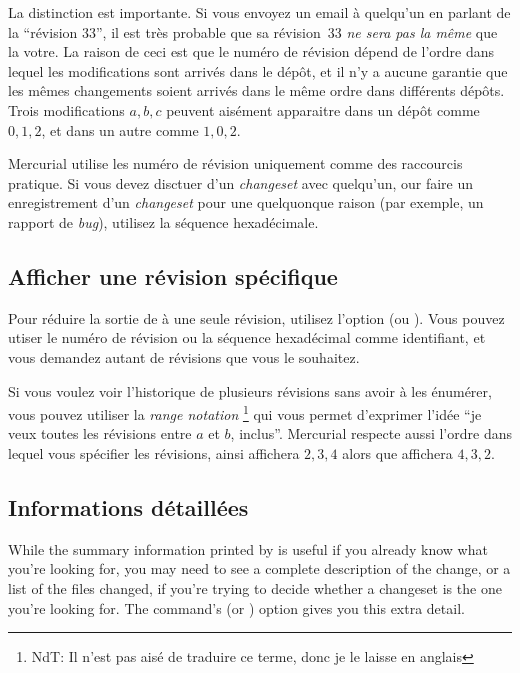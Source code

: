 La distinction est importante. Si vous envoyez un email à quelqu'un en
parlant de la ``révision 33'', il est très probable que sa révision~33
\emph{ne sera pas la même} que la votre. La raison de ceci est que le
numéro de révision dépend de l'ordre dans lequel les modifications sont
arrivés dans le dépôt, et il n'y a aucune garantie que les mêmes changements
soient arrivés dans le même ordre dans différents dépôts. Trois modifications
$a,b,c$ peuvent aisément apparaitre dans un dépôt comme $0,1,2$, et dans
un autre comme $1,0,2$.

Mercurial utilise les numéro de révision uniquement comme des raccourcis
pratique. Si vous devez disctuer d'un \textit{changeset} avec quelqu'un, 
our faire un enregistrement d'un \textit{changeset} pour une quelquonque
raison (par exemple, un rapport de \textit{bug}), utilisez la séquence
hexadécimale.

\subsection{Afficher une révision spécifique}

Pour réduire la sortie de  à une seule révision, utilisez
l'option  (ou ). Vous pouvez utiser
le numéro de révision ou la séquence hexadécimal comme identifiant, et 
vous demandez autant de révisions que vous le souhaitez. 

Si vous voulez voir l'historique de plusieurs révisions sans avoir à 
les énumérer, vous pouvez utiliser la \emph{\textit{range notation}}
\footnote{NdT: Il n'est pas aisé de traduire ce terme, donc je le 
laisse en anglais} qui vous permet d'exprimer l'idée ``je veux toutes
les révisions entre $a$ et $b$, inclus''.
Mercurial respecte aussi l'ordre dans lequel vous spécifier les 
révisions, ainsi  affichera $2,3,4$ alors que 
 affichera $4,3,2$.

\subsection{Informations détaillées}

While the summary information printed by  is useful if you
already know what you're looking for, you may need to see a complete
description of the change, or a list of the files changed, if you're
trying to decide whether a changeset is the one you're looking for.
The  command's  (or )
option gives you this extra detail.

